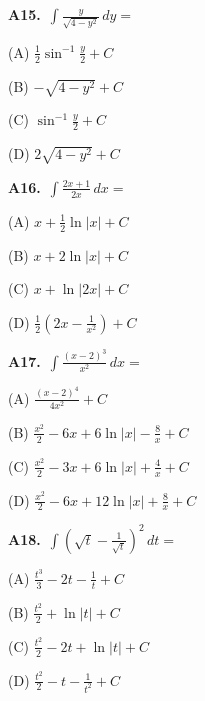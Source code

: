 \documentclass[11pt]{article}
\begin{document}
\bigskip\noindent\textbf{A15.}\ $\displaystyle\int \frac{y}{\sqrt{4-y^2}}\,dy=$
\begin{list}{}{\setlength{\leftmargin}{3em}\setlength{\labelwidth}{2.5em}\setlength{\itemsep}{0pt}\setlength{\topsep}{2pt}}
\item[(A)] $\frac12\sin^{-1}\frac y2+C$
\item[(B)] $-\sqrt{4-y^2}+C$
\item[(C)] $\sin^{-1}\frac y2+C$
\item[(D)] $2\sqrt{4-y^2}+C$
\end{list}

\bigskip\noindent\textbf{A16.}\ $\displaystyle\int \frac{2x+1}{2x}\,dx=$
\begin{list}{}{\setlength{\leftmargin}{3em}\setlength{\labelwidth}{2.5em}\setlength{\itemsep}{0pt}\setlength{\topsep}{2pt}}
\item[(A)] $x+\frac12\ln\lvert x\rvert+C$
\item[(B)] $x+2\ln\lvert x\rvert+C$
\item[(C)] $x+\ln\lvert2x\rvert+C$
\item[(D)] $\frac12(2x-\frac1{x^2})+C$
\end{list}

\bigskip\noindent\textbf{A17.}\ $\displaystyle\int \frac{(x-2)^3}{x^2}\,dx=$
\begin{list}{}{\setlength{\leftmargin}{3em}\setlength{\labelwidth}{2.5em}\setlength{\itemsep}{0pt}\setlength{\topsep}{2pt}}
\item[(A)] $\frac{(x-2)^4}{4x^2}+C$
\item[(B)] $\frac{x^2}2-6x+6\ln\lvert x\rvert-\frac8x+C$
\item[(C)] $\frac{x^2}2-3x+6\ln\lvert x\rvert+\frac4x+C$
\item[(D)] $\frac{x^2}2-6x+12\ln\lvert x\rvert+\frac8x+C$
\end{list}

\bigskip\noindent\textbf{A18.}\ $\displaystyle\int (\sqrt t-\frac1{\sqrt t})^2\,dt=$
\begin{list}{}{\setlength{\leftmargin}{3em}\setlength{\labelwidth}{2.5em}\setlength{\itemsep}{0pt}\setlength{\topsep}{2pt}}
\item[(A)] $\frac{t^3}3-2t-\frac1t+C$
\item[(B)] $\frac{t^2}2+\ln\lvert t\rvert+C$
\item[(C)] $\frac{t^2}2-2t+\ln\lvert t\rvert+C$
\item[(D)] $\frac{t^2}2-t-\frac1{t^2}+C$
\end{list}
\end{document}
